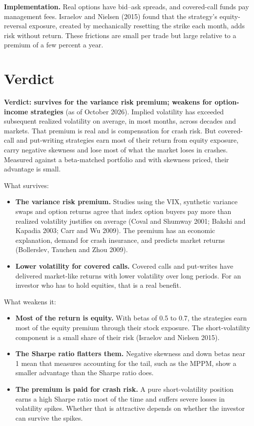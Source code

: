 \textbf{Implementation.} Real options have bid--ask spreads, and covered-call funds pay management fees. Israelov and Nielsen (2015) found that the strategy's equity-reversal exposure, created by mechanically resetting the strike each month, adds risk without return. These frictions are small per trade but large relative to a premium of a few percent a year.

\section{Verdict}
\label{sec:16-verdict}

\begin{callout}
\textbf{Verdict: survives for the variance risk premium; weakens for option-income strategies} (as of October 2026). Implied volatility has exceeded subsequent realized volatility on average, in most months, across decades and markets. That premium is real and is compensation for crash risk. But covered-call and put-writing strategies earn most of their return from equity exposure, carry negative skewness and lose most of what the market loses in crashes. Measured against a beta-matched portfolio and with skewness priced, their advantage is small.
\end{callout}

What survives:

\begin{itemize}
  \item \textbf{The variance risk premium.} Studies using the VIX, synthetic variance swaps and option returns agree that index option buyers pay more than realized volatility justifies on average (Coval and Shumway 2001; Bakshi and Kapadia 2003; Carr and Wu 2009). The premium has an economic explanation, demand for crash insurance, and predicts market returns (Bollerslev, Tauchen and Zhou 2009).
  \item \textbf{Lower volatility for covered calls.} Covered calls and put-writes have delivered market-like returns with lower volatility over long periods. For an investor who has to hold equities, that is a real benefit.
\end{itemize}

What weakens it:

\begin{itemize}
  \item \textbf{Most of the return is equity.} With betas of 0.5 to 0.7, the strategies earn most of the equity premium through their stock exposure. The short-volatility component is a small share of their risk (Israelov and Nielsen 2015).
  \item \textbf{The Sharpe ratio flatters them.} Negative skewness and down betas near 1 mean that measures accounting for the tail, such as the MPPM, show a smaller advantage than the Sharpe ratio does.
  \item \textbf{The premium is paid for crash risk.} A pure short-volatility position earns a high Sharpe ratio most of the time and suffers severe losses in volatility spikes. Whether that is attractive depends on whether the investor can survive the spikes.
\end{itemize}


